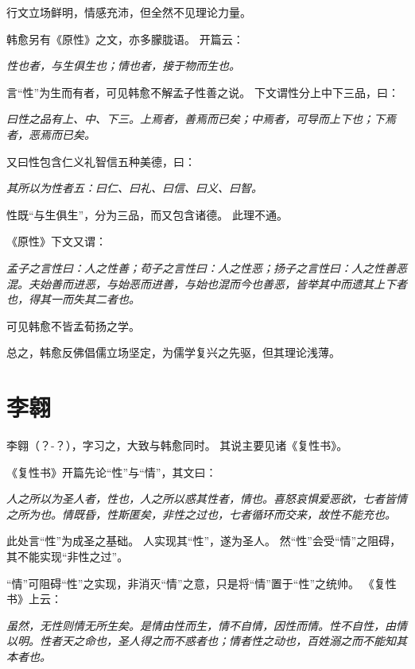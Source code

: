 \documentclass[11pt]{article}
\begin{document}
行文立场鲜明，情感充沛，但全然不见理论力量。

\par

韩愈另有《原性》之文，亦多朦胧语。
开篇云：

\textit{性也者，与生俱生也；情也者，接于物而生也。}

言“性”为生而有者，可见韩愈不解孟子性善之说。
下文谓性分上中下三品，曰：

\textit{曰性之品有上、中、下三。上焉者，善焉而已矣；中焉者，可导而上下也；下焉者，恶焉而已矣。}

又曰性包含仁义礼智信五种美德，曰：

\textit{其所以为性者五：曰仁、曰礼、曰信、曰义、曰智。}

性既“与生俱生”，分为三品，而又包含诸德。
此理不通。

\par

《原性》下文又谓：

\textit{孟子之言性曰：人之性善；苟子之言性曰：人之性恶；扬子之言性曰：人之性善恶混。夫始善而进恶，与始恶而进善，与始也混而今也善恶，皆举其中而遗其上下者也，得其一而失其二者也。}

可见韩愈不皆孟荀扬之学。

\par

总之，韩愈反佛倡儒立场坚定，为儒学复兴之先驱，但其理论浅薄。

\section{李翱}
李翱（？-？），字习之，大致与韩愈同时。
其说主要见诸《复性书》。

\par

《复性书》开篇先论“性”与“情”，其文曰：

\textit{人之所以为圣人者，性也，人之所以惑其性者，情也。喜怒哀惧爱恶欲，七者皆情之所为也。情既昏，性斯匿矣，非性之过也，七者循环而交来，故性不能充也。}

此处言“性”为成圣之基础。
人实现其“性”，遂为圣人。
然“性”会受“情”之阻碍，其不能实现“非性之过”。

\par

“情”可阻碍“性”之实现，非消灭“情”之意，只是将“情”置于“性”之统帅。
《复性书》上云：

\textit{虽然，无性则情无所生矣。是情由性而生，情不自情，因性而情。性不自性，由情以明。性者天之命也，圣人得之而不惑者也；情者性之动也，百姓溺之而不能知其本者也。}
\end{document}
